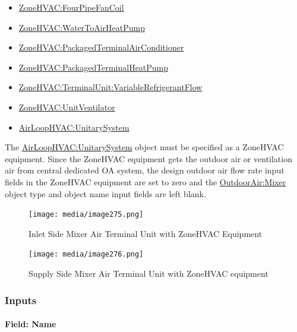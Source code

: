 \begin{itemize}
\setlength{\parskip}{0pt}
\setlength{\itemsep}{0pt plus 2pt}
\item \hyperref[zonehvacfourpipefancoil]{ZoneHVAC:FourPipeFanCoil}
\item \hyperref[zonehvacwatertoairheatpump]{ZoneHVAC:WaterToAirHeatPump}
\item \hyperref[zonehvacpackagedterminalairconditioner]{ZoneHVAC:PackagedTerminalAirConditioner}
\item \hyperref[zonehvacpackagedterminalheatpump]{ZoneHVAC:PackagedTerminalHeatPump}
\item \hyperref[zonehvacterminalunitvariablerefrigerantflow]{ZoneHVAC:TerminalUnit:VariableRefrigerantFlow}
\item \hyperref[zonehvacunitventilator]{ZoneHVAC:UnitVentilator}
\item \hyperref[airloophvacunitarysystem]{AirLoopHVAC:UnitarySystem}
\end{itemize}


The \hyperref[airloophvacunitarysystem]{AirLoopHVAC:UnitarySystem} object must be specified as a ZoneHVAC equipment. Since the ZoneHVAC equipment gets the outdoor air or ventilation air from central dedicated OA system, the design outdoor air flow rate input fields in the ZoneHVAC equipment are set to zero and the \hyperref[outdoorairmixer]{OutdoorAir:Mixer} object type and object name input fields are left blank.

\begin{figure}[hbtp] %
\centering
\texttt{[image: media/image275.png]}
\caption{Inlet Side Mixer Air Terminal Unit with ZoneHVAC Equipment \protect \label{fig:inlet-side-mixer-air-terminal-unit-with-ZoneHVAC-equipment}}
\end{figure}
\begin{figure}[hbtp] %
\centering
\texttt{[image: media/image276.png]}
\caption{Supply Side Mixer Air Terminal Unit with ZoneHVAC equipment \protect \label{fig:supply-side-mixer-air-terminal-unit-with-ZoneHVAC-equipment}}
\end{figure}



\subsubsection{Inputs}\label{inputs-12-000}

\paragraph{Field: Name}\label{field-name-12}

